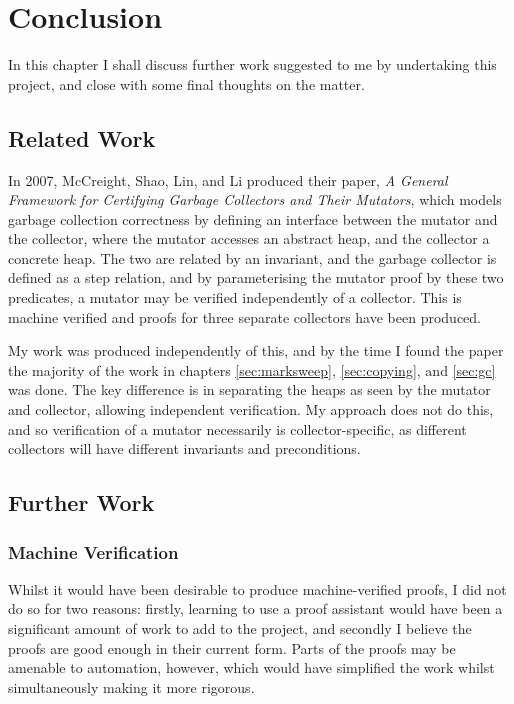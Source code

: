 \chapter{Conclusion}
\label{sec:conclusion}

In this chapter I shall discuss further work suggested to me by
undertaking this project, and close with some final thoughts on the
matter.

\section{Related Work}
\label{sec:conclusion-related}

In 2007, McCreight, Shao, Lin, and Li produced their paper, \textit{A
  General Framework for Certifying Garbage Collectors and Their
  Mutators}\cite{McCreight07}, which models garbage collection
correctness by defining an interface between the mutator and the
collector, where the mutator accesses an abstract heap, and the
collector a concrete heap. The two are related by an invariant, and
the garbage collector is defined as a step relation, and by
parameterising the mutator proof by these two predicates, a mutator
may be verified independently of a collector. This is machine
verified and proofs for three separate collectors have been
produced.

My work was produced independently of this, and by the time I found
the paper the majority of the work in chapters \ref{sec:marksweep},
\ref{sec:copying}, and \ref{sec:gc} was done. The key difference is in
separating the heaps as seen by the mutator and collector, allowing
independent verification. My approach does not do this, and so
verification of a mutator necessarily is collector-specific, as
different collectors will have different invariants and preconditions.

\section{Further Work}
\label{sec:conclusion-further}

\subsection{Machine Verification}
\label{sec:conclusion-further-machineverification}

Whilst it would have been desirable to produce machine-verified
proofs, I did not do so for two reasons: firstly, learning to use a
proof assistant would have been a significant amount of work to add to
the project, and secondly I believe the proofs are good enough in
their current form. Parts of the proofs may be amenable to automation,
however, which would have simplified the work whilst simultaneously
making it more rigorous.

